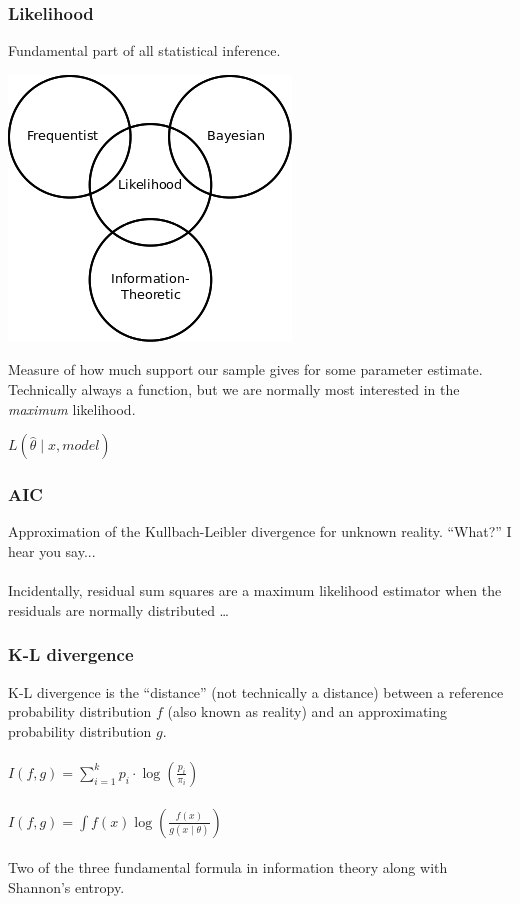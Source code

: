 \documentclass{beamer}\usepackage{graphicx, color}
\begin{document}
\begin{frame}
\frametitle{Likelihood}
Fundamental part of all statistical inference. 
\begin{center}
\includegraphics[height = 0.3\textheight]{stat_schools}
\end{center}

Measure of how much support our sample gives for some parameter estimate.
Technically always a function, but we are normally most interested in the \emph{maximum} likelihood.
\begin{center}
\begin{math}
L(\hat{\theta} \mid x, model)
\end{math}
\end{center}

\end{frame}


\begin{frame}
\frametitle{AIC}
Approximation of the Kullbach-Leibler divergence for unknown reality.
``What?'' I hear you say...
\\~\\
\small{Incidentally, residual sum squares are a maximum likelihood estimator when the residuals are normally distributed \ldots}
\end{frame}



\begin{frame}
\frametitle{K-L divergence}

K-L divergence is the ``distance'' (not technically a distance) between a reference probability distribution \(f\) (also known as reality) and an approximating probability distribution \(g\).
\\~\\
\begin{math}
I(f,g) = \sum_{i=1}^{k} p_i \cdot \log(\frac{p_i}{\pi_i})
\end{math}
\\~\\
\begin{math}
I(f,g) = \int f(x)\log(\frac{f(x)}{g(x \mid \theta)})
\end{math}
\\~\\
Two of the three fundamental formula in information theory along with Shannon's entropy.

\end{frame}
\end{document}
